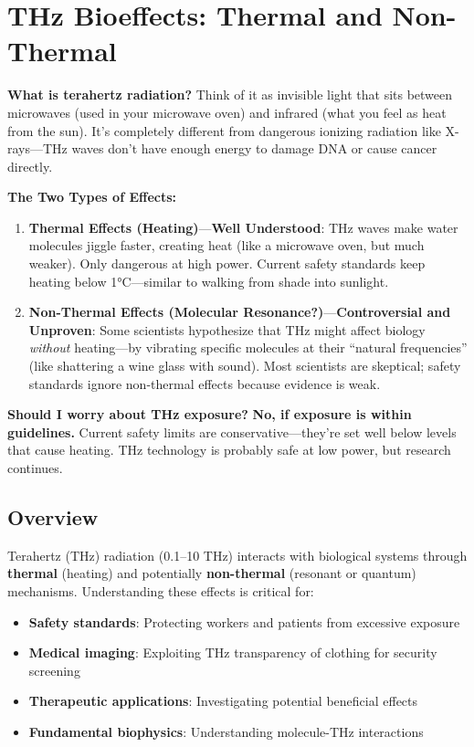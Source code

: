 \chapter{THz Bioeffects: Thermal and Non-Thermal}
\label{ch:thz-bioeffects}

\begin{nontechnical}
\textbf{What is terahertz radiation?}
Think of it as invisible light that sits between microwaves (used in your microwave oven) and infrared (what you feel as heat from the sun). It's completely different from dangerous ionizing radiation like X-rays---THz waves don't have enough energy to damage DNA or cause cancer directly.

\textbf{The Two Types of Effects:}
\begin{enumerate}
\item \textbf{Thermal Effects (Heating)}---\textbf{Well Understood}: THz waves make water molecules jiggle faster, creating heat (like a microwave oven, but much weaker). Only dangerous at high power. Current safety standards keep heating below 1°C---similar to walking from shade into sunlight.

\item \textbf{Non-Thermal Effects (Molecular Resonance?)}---\textbf{Controversial and Unproven}: Some scientists hypothesize that THz might affect biology \emph{without} heating---by vibrating specific molecules at their ``natural frequencies'' (like shattering a wine glass with sound). Most scientists are skeptical; safety standards ignore non-thermal effects because evidence is weak.
\end{enumerate}

\textbf{Should I worry about THz exposure?}
\textbf{No, if exposure is within guidelines.} Current safety limits are conservative---they're set well below levels that cause heating. THz technology is probably safe at low power, but research continues.
\end{nontechnical}

\section{Overview}

Terahertz (THz) radiation (0.1--10 THz) interacts with biological systems through \textbf{thermal} (heating) and potentially \textbf{non-thermal} (resonant or quantum) mechanisms. Understanding these effects is critical for:
\begin{itemize}
\item \textbf{Safety standards}: Protecting workers and patients from excessive exposure
\item \textbf{Medical imaging}: Exploiting THz transparency of clothing for security screening
\item \textbf{Therapeutic applications}: Investigating potential beneficial effects
\item \textbf{Fundamental biophysics}: Understanding molecule-THz interactions
\end{itemize}

